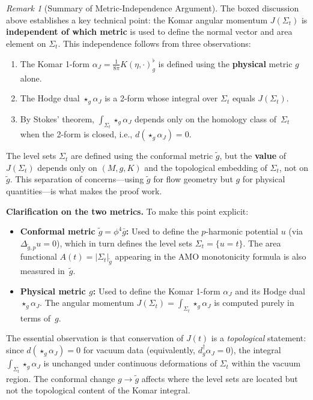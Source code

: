 \documentclass[12pt]{article}
\theoremstyle{plain}
\theoremstyle{definition}
\theoremstyle{remark}
\newtheorem{remark}[theorem]{Remark}
\begin{document}
\begin{remark}[Summary of Metric-Independence Argument]\label{rem:metric-indep-summary}
The boxed discussion above establishes a key technical point: the Komar angular momentum $J(\Sigma_t)$ is \textbf{independent of which metric} is used to define the normal vector and area element on $\Sigma_t$. 
This independence follows from three observations:
\begin{enumerate}
    \item The Komar 1-form $\alpha_J = \frac{1}{8\pi}K(\eta, \cdot)^\flat_g$ is defined using the \textbf{physical} metric $g$ alone.
    \item The Hodge dual $\star_g \alpha_J$ is a 2-form whose integral over $\Sigma_t$ equals $J(\Sigma_t)$.
    \item By Stokes' theorem, $\int_{\Sigma_t} \star_g \alpha_J$ depends only on the homology class of~$\Sigma_t$ when the 2-form is closed, i.e., $d(\star_g\alpha_J) = 0$.
\end{enumerate}
The level sets $\Sigma_t$ are defined using the conformal metric $\tilde{g}$, but the \textbf{value} of $J(\Sigma_t)$ depends only on $(M, g, K)$ and the topological embedding of $\Sigma_t$, not on $\tilde{g}$. This separation of concerns---using $\tilde{g}$ for flow geometry but $g$ for physical quantities---is what makes the proof work.

\textbf{Clarification on the two metrics.} To make this point explicit:
\begin{itemize}
    \item \textbf{Conformal metric $\tilde{g} = \phi^4 \bar{g}$:} Used to define the $p$-harmonic potential $u$ (via $\Delta_{\tilde{g},p} u = 0$), which in turn defines the level sets $\Sigma_t = \{u = t\}$. The area functional $A(t) = |\Sigma_t|_{\tilde{g}}$ appearing in the AMO monotonicity formula is also measured in~$\tilde{g}$.
    \item \textbf{Physical metric $g$:} Used to define the Komar 1-form $\alpha_J$ and its Hodge dual $\star_g \alpha_J$. The angular momentum $J(\Sigma_t) = \int_{\Sigma_t} \star_g \alpha_J$ is computed purely in terms of~$g$.
\end{itemize}
The essential observation is that conservation of $J(t)$ is a \emph{topological} statement: since $d(\star_g \alpha_J) = 0$ for vacuum data (equivalently, $d^\dagger_g \alpha_J = 0$), the integral $\int_{\Sigma_t} \star_g \alpha_J$ is unchanged under continuous deformations of $\Sigma_t$ within the vacuum region. The conformal change $g \to \tilde{g}$ affects where the level sets are located but not the topological content of the Komar integral.
\end{remark}
\end{document}
